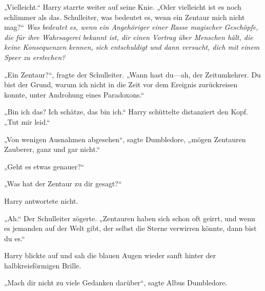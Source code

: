 „Vielleicht.“ Harry starrte weiter auf seine Knie.
„Oder vielleicht ist es noch schlimmer als das. Schulleiter, was bedeutet es, wenn ein Zentaur mich nicht mag?“
\emph{Was bedeutet es, wenn ein Angehöriger einer Rasse magischer Geschöpfe, die für ihre Wahrsagerei bekannt ist, dir einen Vortrag über Menschen hält, die keine Konsequenzen kennen, sich entschuldigt und dann versucht, dich mit einem Speer zu erstechen?}

„Ein Zentaur?“, fragte der Schulleiter.
„Wann hast du—ah, der Zeitumkehrer. Du bist der Grund, warum ich nicht in die Zeit vor dem Ereignis zurückreisen konnte, unter Androhung eines Paradoxons.“

„Bin ich das? Ich schätze, das bin ich.“ Harry schüttelte distanziert den Kopf.
„Tut mir leid.“

„Von wenigen Ausnahmen abgesehen“, sagte Dumbledore, „mögen Zentauren Zauberer, ganz und gar nicht.“

„Geht es etwas genauer?“

„Was hat der Zentaur zu dir gesagt?“

Harry antwortete nicht.

„Ah.“ Der Schulleiter zögerte.
„Zentauren haben sich schon oft geirrt, und wenn es jemanden auf der Welt gibt, der selbst die Sterne verwirren könnte, dann bist du es.“

Harry blickte auf und sah die blauen Augen wieder sanft hinter der halbkreisförmigen Brille.

„Mach dir nicht zu viele Gedanken darüber“, sagte Albus Dumbledore.

